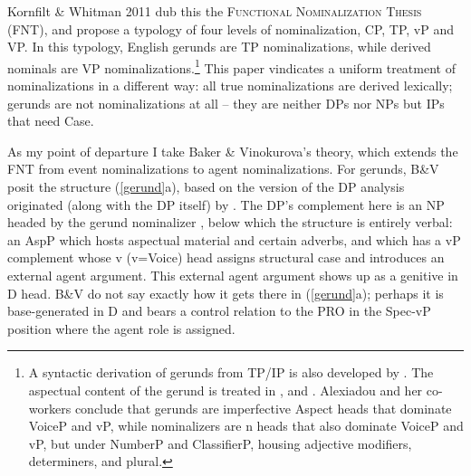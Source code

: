 \documentclass[output=paper,
modfonts
]{LSP/langsci}
\newcommand{\rfa}[2]{(\ref{#1}{#2})}
\def\urf#1{$^{\textrm{\scriptsize{#1}}}$}
\begin{document}
Kornfilt \& Whitman 2011 dub this the \textsc{Functional Nominalization Thesis} (FNT), and
propose a typology of four levels of nominalization, CP, TP, vP and VP. In this typology,
English gerunds are TP nominalizations, while derived nominals are VP
nominalizations.\footnote{A syntactic derivation of gerunds from TP/IP is also developed by
  \citealt{pires2006}.  The aspectual content of the gerund is treated in \citealt{pustejovsky1995,alexiadou2001}, and \citealt{alexiadou2010}.  Alexiadou and her co-workers conclude
  that gerunds are imperfective Aspect heads that dominate VoiceP and vP, while nominalizers
  are n heads that also dominate VoiceP and vP, but under NumberP and ClassifierP, housing
  adjective modifiers, determiners, and plural.} This paper vindicates a uniform treatment of
nominalizations in a different way:  all true nominalizations are derived lexically; gerunds
are not nominalizations at all – they are neither DPs nor NPs but IPs that need Case.

As my point of departure I take Baker \& Vinokurova's \citeyearpar{baker2009} theory, which extends the FNT from
event nominalizations to agent nominalizations.  For gerunds, B\&V posit the structure
\rfa{gerund}{a}, based on the version of the DP analysis originated (along with the DP itself) by
\citealt{abney1987}.  The DP's complement here is an NP headed by the gerund nominalizer
\form{-ing\urf{V}}, below which the structure is entirely verbal:  an AspP which hosts
aspectual material and certain adverbs, and which has a vP complement whose v (v=Voice) head
assigns structural case and introduces an external agent argument. This external agent argument
shows up as a genitive in D head. B\&V do not say exactly how it gets there in \rfa{gerund}{a};
perhaps it is base-generated in D and bears a control relation to the PRO in the Spec-vP
position where the agent role is assigned.
\end{document}
